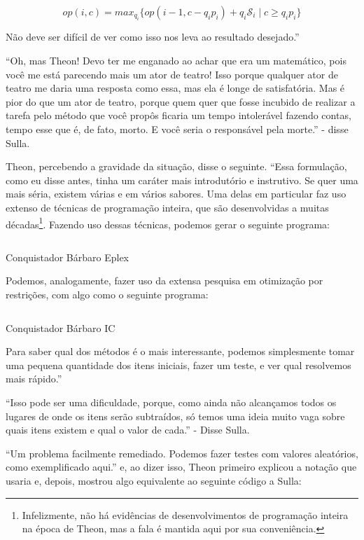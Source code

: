 \documentclass{article}
\begin{document}
\[
  op(i,c) =
    max_{q_i}\{op(i-1, c-q_i p_i) + q_i \mathscr{S}_i\; |\; c \geq q_i p_i\}
\]

Não deve ser difícil de ver como isso nos leva ao resultado desejado.''

``Oh, mas Theon! Devo ter me enganado ao achar que era um matemático, pois você me está parecendo
  mais um ator de teatro! Isso porque qualquer ator de teatro me daria uma resposta como essa, mas
  ela é longe de satisfatória. Mas é pior do que um ator de teatro, porque quem quer que fosse
  incubido de realizar a tarefa pelo método que você propôs ficaria um tempo intolerável fazendo
  contas, tempo esse que é, de fato, morto. E você seria o responsável pela morte.'' - disse Sulla.

  Theon, percebendo a gravidade da situação, disse o seguinte. ``Essa formulação, como eu disse
  antes, tinha um caráter mais introdutório e instrutivo. Se quer uma mais séria, existem várias e
  em vários sabores. Uma delas em particular faz uso extenso de técnicas de programação inteira, que
  são desenvolvidas a muitas décadas\footnote{Infelizmente, não há evidências de desenvolvimentos de
  programação inteira na época de Theon, mas a fala é mantida aqui por sua conveniência.}. Fazendo
  uso dessas técnicas, podemos gerar o seguinte programa:

  \begin{listing}
    \inputminted{prolog}{../Exemplos/Cap12/prog1-knapSackEplex.ecl}
    \caption{Conquistador Bárbaro Eplex}\label{lst:knapsackEplex}
  \end{listing}

  Podemos, analogamente, fazer uso da extensa pesquisa em otimização por restrições, com algo como o
  seguinte programa:

  \begin{listing}[H]
    \inputminted{prolog}{../Exemplos/Cap12/prog2-knapSackIc.ecl}
    \caption{Conquistador Bárbaro IC}\label{lst:knapsackIC}
  \end{listing}

  Para saber qual dos métodos é o mais interessante, podemos simplesmente tomar uma pequena quantidade dos itens
  iniciais, fazer um teste, e ver qual resolvemos mais rápido.''

  ``Isso pode ser uma dificuldade, porque, como ainda não alcançamos todos os lugares de onde os
  itens serão subtraídos, só temos uma ideia muito vaga sobre quais itens existem e qual o valor de
  cada.'' - Disse Sulla.

  ``Um problema facilmente remediado. Podemos fazer testes com valores aleatórios, como exemplificado aqui.'' e, ao dizer isso, Theon
  primeiro explicou a notação que usaria e, depois, mostrou algo equivalente ao seguinte código a Sulla:
\end{document}
